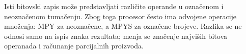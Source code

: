 Isti bitovski zapis može predstavljati različite operande u označenom i neoznačenom tumačenju. Zbog toga procesor često ima odvojene operacije množenja: MPY za neoznačene, a MPYS za označene brojeve. Razlika se ne odnosi samo na ispis znaka rezultata; menja se značenje najviših bitova operanada i računanje parcijalnih proizvoda.
